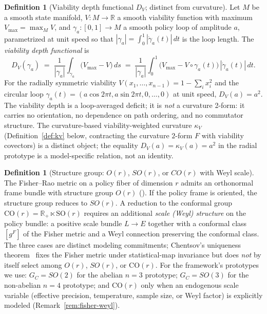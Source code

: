\documentclass[11pt,a4paper]{article}
\theoremstyle{plain}
\theoremstyle{definition}
\newtheorem{definition}[theorem]{Definition}
\theoremstyle{remark}
\newcommand{\kk}{\kappa_{\!V}}
\newcommand{\RR}{\mathbb{R}}
\newcommand{\SO}{\mathrm{SO}}
\newcommand{\CO}{\mathrm{CO}}
\begin{document}
\begin{definition}[Viability depth functional $D_V$; distinct from curvature]
\label{def:kappa-depth}
Let $M$ be a smooth state manifold, $V:M\to\RR$ a smooth viability
function with maximum $V_{\max}=\max_M V$, and $\gamma_a:[0,1]\to M$ a
smooth policy loop of amplitude $a$, parametrized at unit speed so that
$|\gamma_a| = \int_0^1|\dot\gamma_a(t)|\,dt$ is the loop length. The
\emph{viability depth functional} is
\begin{equation}\label{eq:DV}
  D_V(\gamma_a) \;=\; \frac{1}{|\gamma_a|}\int_{\gamma_a}\!\bigl(V_{\max}-V\bigr)\,ds
  \;=\; \frac{1}{|\gamma_a|}\int_0^1\!\bigl(V_{\max}-V\circ\gamma_a(t)\bigr)\,|\dot\gamma_a(t)|\,dt.
\end{equation}
For the radially symmetric viability $V(x_1,\ldots,x_{n-1}) = 1 - \sum_i
x_i^2$ and the circular loop $\gamma_a(t) = (a\cos 2\pi t, a\sin 2\pi t,
0,\ldots,0)$ at unit speed, $D_V(a) = a^2$. The viability depth is a
loop-averaged deficit; it is \emph{not} a curvature 2-form: it carries
no orientation, no dependence on path ordering, and no commutator
structure. The curvature-based viability-weighted curvature $\kk$
(Definition~\ref{def:kv} below, contracting the curvature
$2$-form $F$ with viability covectors) is a distinct object; the
equality $D_V(a) = \kk(a) = a^2$ in the radial prototype is a
model-specific relation, not an identity.
\end{definition}

\begin{definition}[Structure group: $O(r)$, $SO(r)$, or $CO(r)$ with Weyl scale]
\label{def:struct}
The Fisher--Rao metric on a policy fiber of dimension $r$ admits an
orthonormal frame bundle with structure group $O(r)$
(\cite{kobayashinomizu1969,amari2000}). If the policy frame is
oriented, the structure group reduces to $SO(r)$. A reduction to the
conformal group $\CO(r) = \RR_+ \ltimes \SO(r)$ requires an additional
\emph{scale (Weyl) structure} on the policy bundle: a positive scale
bundle $L \to E$ together with a conformal class $[g^F]$ of the
Fisher metric and a Weyl connection preserving the conformal class.
The three cases are distinct modeling commitments; Chentsov's
uniqueness theorem~\cite{chentsov1982} fixes the Fisher metric under
statistical-map invariance but does \emph{not} by itself select among
$O(r)$, $SO(r)$, or $\CO(r)$. For the framework's prototypes we use:
$G_C = SO(2)$ for the abelian $n=3$ prototype; $G_C = SO(3)$ for the
non-abelian $n=4$ prototype; and $\CO(r)$ only when an endogenous
scale variable (effective precision, temperature, sample size, or
Weyl factor) is explicitly modeled (Remark~\ref{rem:fisher-weyl}).
\end{definition}
\end{document}
